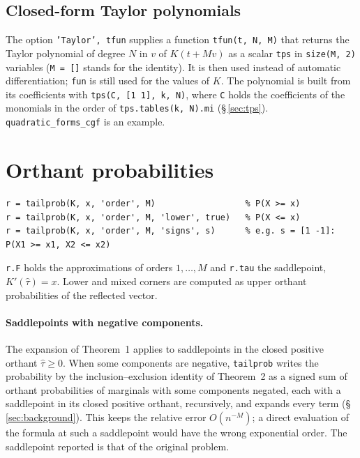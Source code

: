 \documentclass[11pt]{article}
\newcommand{\prog}[1]{\texttt{#1}}
\begin{document}
\subsection{Closed-form Taylor polynomials}\label{sec:taylorfun}

The option \prog{'Taylor', tfun} supplies a function \prog{tfun(t, N, M)} that returns the Taylor
polynomial of degree $N$ in $v$ of $K(t+Mv)$ as a scalar \prog{tps} in \prog{size(M, 2)} variables
(\prog{M = []} stands for the identity). It is then used instead of automatic differentiation;
\prog{fun} is still used for the values of $K$. The polynomial is built from its coefficients with
\prog{tps(C, [1 1], k, N)}, where \prog{C} holds the coefficients of the monomials in the order of
\prog{tps.tables(k, N).mi} (\S\,\ref{sec:tps}). \prog{quadratic\_forms\_cgf} is an example.

\section{Orthant probabilities}\label{sec:tail}

\begin{lstlisting}
r = tailprob(K, x, 'order', M)                  % P(X >= x)
r = tailprob(K, x, 'order', M, 'lower', true)   % P(X <= x)
r = tailprob(K, x, 'order', M, 'signs', s)      % e.g. s = [1 -1]: P(X1 >= x1, X2 <= x2)
\end{lstlisting}
\prog{r.F} holds the approximations of orders $1,\ldots,M$ and \prog{r.tau} the saddlepoint,
$K'(\hat\tau)=x$. Lower and mixed corners are computed as upper orthant probabilities of the
reflected vector.

\paragraph{Saddlepoints with negative components.} The expansion of Theorem~1 applies to
saddlepoints in the closed positive orthant $\hat\tau\geq0$. When some components are negative,
\prog{tailprob} writes the probability by the inclusion--exclusion identity of Theorem~2 as a
signed sum of orthant probabilities of marginals with some components negated, each with a
saddlepoint in its closed positive orthant, recursively, and expands every term
(\S\,\ref{sec:background}). This keeps the relative error $O(n^{-M})$; a direct evaluation of the
formula at such a saddlepoint would have the wrong exponential order. The saddlepoint reported is
that of the original problem.
\end{document}
